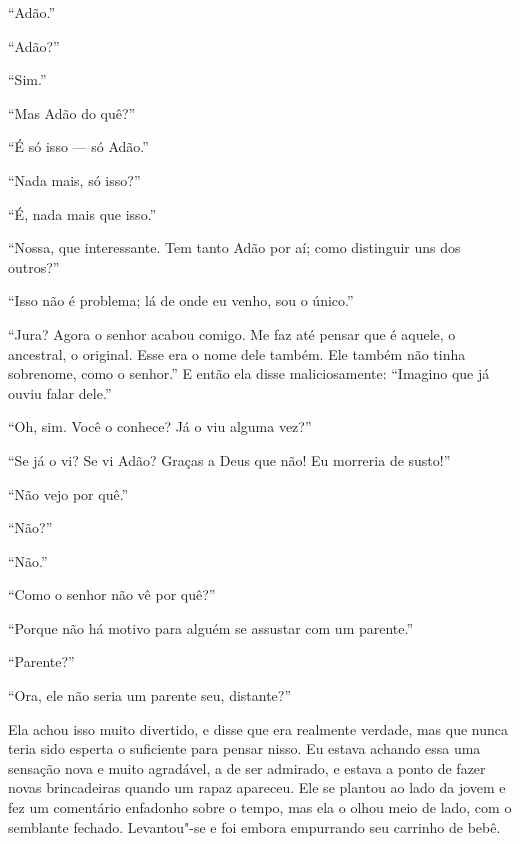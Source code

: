 “Adão.”

“Adão?”

“Sim.”

“Mas Adão do quê?”

“É só isso --- só Adão.”

“Nada mais, só isso?”

“É, nada mais que isso.”

“Nossa, que interessante. Tem tanto Adão por aí; como distinguir uns dos outros?”

“Isso não é problema; lá de onde eu venho, sou o único.”

“Jura? Agora o senhor acabou comigo. Me faz até pensar que é aquele, o
ancestral, o original. Esse era o nome dele também. Ele também não tinha
sobrenome, como o senhor.” E então ela disse maliciosamente: “Imagino que já ouviu falar
dele.”

“Oh, sim. Você o conhece? Já o viu alguma vez?”

“Se já o vi? Se vi Adão? Graças a Deus que não! Eu morreria de susto!”

“Não vejo por quê.”

“Não?”

“Não.”

“Como o senhor não vê por quê?”

“Porque não há motivo para alguém se assustar com um parente.”

“Parente?”

“Ora, ele não seria um parente seu, distante?”

Ela achou isso muito divertido, e disse que era realmente verdade,
mas que nunca teria sido esperta o suficiente para pensar nisso. Eu estava
achando essa uma sensação nova e muito agradável, a de ser admirado, e estava a
ponto de fazer novas brincadeiras quando um rapaz apareceu. Ele se
plantou ao lado da jovem e fez um comentário enfadonho sobre o tempo, mas ela o
olhou meio de lado, com o semblante fechado. Levantou"-se e foi embora empurrando seu carrinho de bebê.



